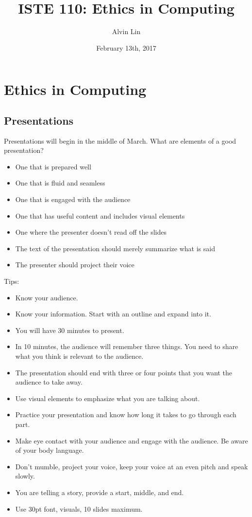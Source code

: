 \documentclass[letterpaper, 12pt]{article}
\title{ISTE 110: Ethics in Computing}
\author{Alvin Lin}
\date{February 13th, 2017}
\begin{document}
\maketitle

\section*{Ethics in Computing}

\subsection*{Presentations}
Presentations will begin in the middle of March.
What are elements of a good presentation?
\begin{itemize}
  \item One that is prepared well
  \item One that is fluid and seamless
  \item One that is engaged with the audience
  \item One that has useful content and includes visual elements
  \item One where the presenter doesn't read off the slides
  \item The text of the presentation should merely summarize what is said
  \item The presenter should project their voice
\end{itemize}
Tips:
\begin{itemize}
  \item Know your audience.
  \item Know your information. Start with an outline and expand into it.
  \item You will have 30 minutes to present.
  \item In 10 minutes, the audience will remember three things. You need to
    share what you think is relevant to the audience.
  \item The presentation should end with three or four points that you want
    the audience to take away.
  \item Use visual elements to emphasize what you are talking about.
  \item Practice your presentation and know how long it takes to go through
    each part.
  \item Make eye contact with your audience and engage with the audience. Be
    aware of your body language.
  \item Don't mumble, project your voice, keep your voice at an even pitch and
    speak slowly.
  \item You are telling a story, provide a start, middle, and end.
  \item Use 30pt font, visuals, 10 slides maximum.
\end{itemize}
\end{document}

